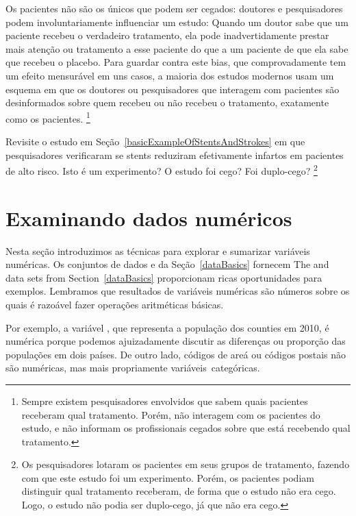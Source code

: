 Os pacientes  não são os únicos que podem ser cegados:
doutores e pesquisadores podem involuntariamente influenciar um estudo:
Quando um doutor sabe que um paciente recebeu o verdadeiro tratamento, ela pode inadvertidamente prestar mais atenção ou tratamento a esse paciente do que a um paciente de que ela sabe que recebeu o placebo.
Para guardar contra este bias, que comprovadamente tem um efeito mensurável em uns casos, a maioria dos estudos modernos usam um esquema  em que os doutores ou pesquisadores que interagem com pacientes são desinformados sobre quem recebeu ou não recebeu o tratamento, exatamente como os pacientes.
\footnote{Sempre existem pesquisadores envolvidos que sabem quais pacientes receberam qual tratamento.
  Porém, não interagem com os pacientes do estudo, e não informam os profissionais cegados sobre que está recebendo qual tratamento.}

\begin{exercise}
  Revisite o estudo em Seção~\ref{basicExampleOfStentsAndStrokes} em que pesquisadores verificaram se stents reduziram efetivamente infartos em pacientes de alto risco.
  Isto é um experimento?
  O estudo foi cego?
  Foi duplo-cego?
  \footnote{Os pesquisadores lotaram os pacientes em seus grupos de tratamento, fazendo com que este estudo foi um experimento.
    Porém, os pacientes podiam distinguir qual tratamento receberam, de forma que o estudo não era cego.
    Logo, o estudo não podia ser duplo-cego, já que não era cego.}
\end{exercise}

\section[Examinando dados numéricos]{Examinando dados numéricos }
\label{numericalData}

Nesta seção introduzimos as técnicas para explorar e sumarizar variáveis numéricas.
Os conjuntos de dados  e  da Seção~\ref{dataBasics} fornecem
The  and  data sets from Section~\ref{dataBasics} proporcionam ricas oportunidades para exemplos.
Lembramos que resultados de variáveis numéricas são números sobre os quais é razoável fazer operações aritméticas básicas.

Por exemplo, a variável , que representa a população dos counties em 2010, é numérica porque podemos ajuizadamente discutir as diferenças ou proporção das populações em dois países.
De outro lado, códigos de areá ou códigos postais não são numéricas, mas mais propriamente variáveis~categóricas.

